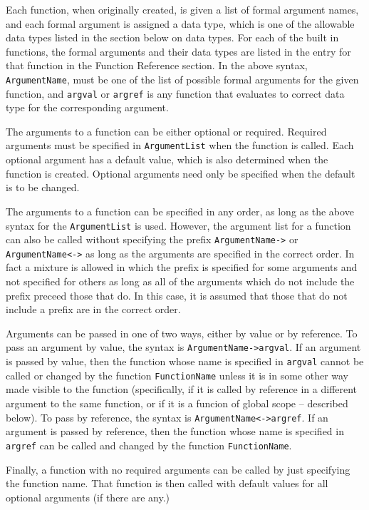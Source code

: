 Each function, when originally created, is given a list of formal
argument names, and each formal argument is assigned a data type,
which is one of the allowable data types listed in the section below
on data types.  For each of the built in functions, the formal
arguments and their data types are listed in the entry for that
function in the Function Reference section.  In the above syntax,
\verb+ArgumentName+, must be one of the list of possible formal
arguments for the given function, and \verb+argval+ or \verb+argref+
is any function that evaluates to correct data type for the
corresponding argument. 

The arguments to a function can be either optional or required.
Required arguments must be specified in \verb+ArgumentList+ when the
function is called.  Each optional argument has a default value, which
is also determined when the function is created.  Optional arguments
need only be specified when the default is to be changed.

The arguments to a function can be specified in any order, as long as
the above syntax for the \verb+ArgumentList+ is used.  However, the
argument list for a function can also be called without specifying the 
prefix \verb+ArgumentName->+ or \verb+ArgumentName<->+ as long as the 
arguments are specified in the correct order.  In fact a mixture is 
allowed in which the prefix is specified for some arguments and not
specified for others as long as all of the arguments which do not
include the prefix preceed those that do.  In this case, it is assumed
that those that do not include a prefix are in the correct order.  

Arguments can be passed in one of two ways, either by value or by
reference.  To pass an argument by value, the syntax is
\verb+ArgumentName->argval+.  If an argument is passed by value, then the
function whose name is specified in \verb+argval+ cannot be called
or changed by the function \verb+FunctionName+ unless it is in some
other way made visible to the function (specifically, if it is called
by reference in a different argument to the same function, or if it is a
funcion of global scope -- described below).  To pass by reference,
the syntax is \verb+ArgumentName<->argref+.  If an argument is passed
by reference, then the function whose name is specified in
\verb+argref+ can be called and changed by the function
\verb+FunctionName+.  

Finally, a function with no required arguments can be called by just
specifying the function name.  That function is then called with
default values for all optional arguments (if there are any.)

